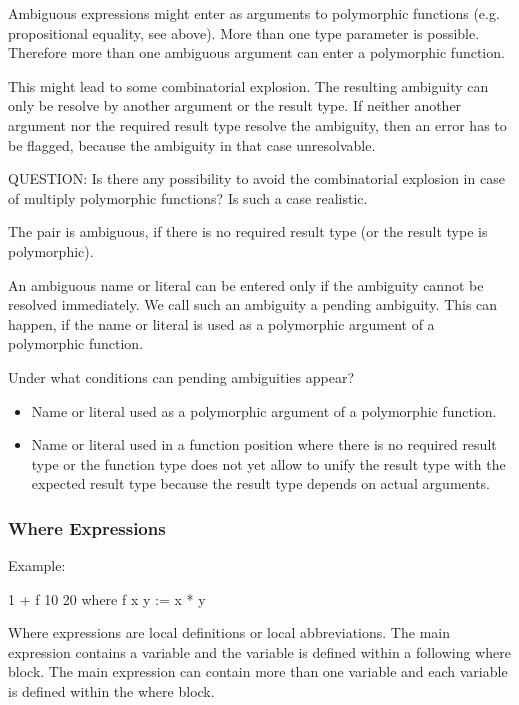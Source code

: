Ambiguous expressions might enter as arguments to polymorphic functions (e.g.
propositional equality, see above). More than one type parameter is possible.
Therefore more than one ambiguous argument can enter a polymorphic function.

This might lead to some combinatorial explosion. The resulting ambiguity can
only be resolve by another argument or the result type. If neither another
argument nor the required result type resolve the ambiguity, then an error has
to be flagged, because the ambiguity in that case unresolvable.

QUESTION: Is there any possibility to avoid the combinatorial explosion in case
of multiply polymorphic functions? Is such a case realistic.

The pair  is ambiguous, if there is no required result type (or the
result type is polymorphic).

An ambiguous name or literal can be entered only if the ambiguity cannot be
resolved immediately. We call such an ambiguity a pending ambiguity. This can
happen, if the name or literal is used as a polymorphic argument of a
polymorphic function.

Under what conditions can pending ambiguities appear?
\begin{itemize}

\item Name or literal used as a polymorphic argument of a polymorphic function.

\item Name or literal used in a function position where there is no required
result type or the function type does not yet allow to unify the result type
with the expected result type because the result type depends on actual
arguments.

\end{itemize}





\vskip 5mm
\subsubsection{Where Expressions}

Example:

\begin{alba}
    1 + f 10 20 where
        f x y := x * y
\end{alba}

Where expressions are local definitions or local abbreviations. The main
expression contains a variable and the variable is defined within a following
where block. The main expression can contain more than one variable and each
variable is defined within the where block.


